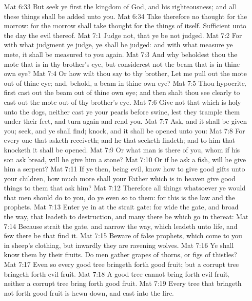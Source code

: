 \vs Mat 6:33 But seek ye first the kingdom of God, and his righteousness; and all these things shall be added unto you.
\vs Mat 6:34 Take therefore no thought for the morrow: for the morrow shall take thought for the things of itself. Sufficient unto the day  the evil thereof.
\vs Mat 7:1 Judge not, that ye be not judged.
\vs Mat 7:2 For with what judgment ye judge, ye shall be judged: and with what measure ye mete, it shall be measured to you again.
\vs Mat 7:3 And why beholdest thou the mote that is in thy brother's eye, but considerest not the beam that is in thine own eye?
\vs Mat 7:4 Or how wilt thou say to thy brother, Let me pull out the mote out of thine eye; and, behold, a beam  in thine own eye?
\vs Mat 7:5 Thou hypocrite, first cast out the beam out of thine own eye; and then shalt thou see clearly to cast out the mote out of thy brother's eye.
\vs Mat 7:6 Give not that which is holy unto the dogs, neither cast ye your pearls before swine, lest they trample them under their feet, and turn again and rend you.
\vs Mat 7:7 Ask, and it shall be given you; seek, and ye shall find; knock, and it shall be opened unto you:
\vs Mat 7:8 For every one that asketh receiveth; and he that seeketh findeth; and to him that knocketh it shall be opened.
\vs Mat 7:9 Or what man is there of you, whom if his son ask bread, will he give him a stone?
\vs Mat 7:10 Or if he ask a fish, will he give him a serpent?
\vs Mat 7:11 If ye then, being evil, know how to give good gifts unto your children, how much more shall your Father which is in heaven give good things to them that ask him?
\vs Mat 7:12 Therefore all things whatsoever ye would that men should do to you, do ye even so to them: for this is the law and the prophets.
\vs Mat 7:13 Enter ye in at the strait gate: for wide  the gate, and broad  the way, that leadeth to destruction, and many there be which go in thereat:
\vs Mat 7:14 Because strait  the gate, and narrow  the way, which leadeth unto life, and few there be that find it.
\vs Mat 7:15 Beware of false prophets, which come to you in sheep's clothing, but inwardly they are ravening wolves.
\vs Mat 7:16 Ye shall know them by their fruits. Do men gather grapes of thorns, or figs of thistles?
\vs Mat 7:17 Even so every good tree bringeth forth good fruit; but a corrupt tree bringeth forth evil fruit.
\vs Mat 7:18 A good tree cannot bring forth evil fruit, neither  a corrupt tree bring forth good fruit.
\vs Mat 7:19 Every tree that bringeth not forth good fruit is hewn down, and cast into the fire.
